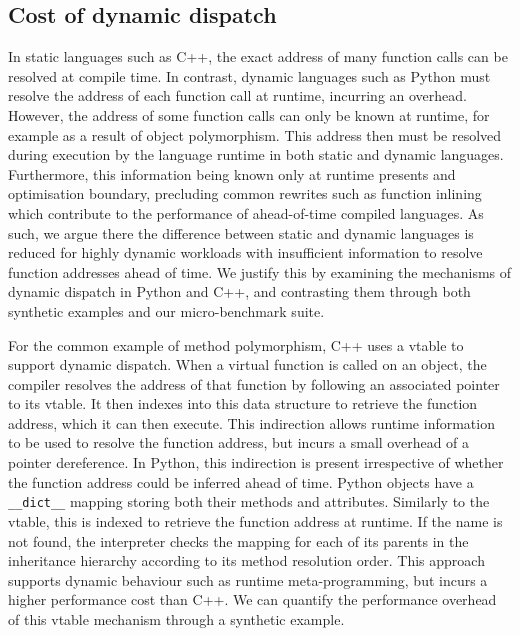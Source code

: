 \subsection{Cost of dynamic dispatch}

In static languages such as C++, the exact address of many function calls can be resolved at compile time. In contrast, dynamic languages such as Python must resolve the address of each function call at runtime, incurring an overhead.
However, the address of some function calls can only be known at runtime, for example as a result of object polymorphism. This address then must be resolved during execution by the language runtime in both static and dynamic languages. Furthermore, this information being known only at runtime presents and optimisation boundary, precluding common rewrites such as function inlining which contribute to the performance of ahead-of-time compiled languages.
As such, we argue there the difference between static and dynamic languages is reduced for highly dynamic workloads with insufficient information to resolve function addresses ahead of time.
We justify this by examining the mechanisms of dynamic dispatch in Python and C++, and contrasting them through both synthetic examples and our micro-benchmark suite.

For the common example of method polymorphism, C++ uses a \ac{vtable} to support dynamic dispatch.
When a virtual function is called on an object, the compiler resolves the address of that function by following an associated pointer to its \ac{vtable}. It then indexes into this data structure to retrieve the function address, which it can then execute. This indirection allows runtime information to be used to resolve the function address, but incurs a small overhead of a pointer dereference.
In Python, this indirection is present irrespective of whether the function address could be inferred ahead of time. Python objects have a \texttt{__dict__} mapping storing both their methods and attributes. Similarly to the \ac{vtable}, this is indexed to retrieve the function address at runtime. If the name is not found, the interpreter checks the mapping for each of its parents in the inheritance hierarchy according to its method resolution order. This approach supports dynamic behaviour such as runtime meta-programming, but incurs a higher performance cost than C++.
We can quantify the performance overhead of this \ac{vtable} mechanism through a synthetic example.

